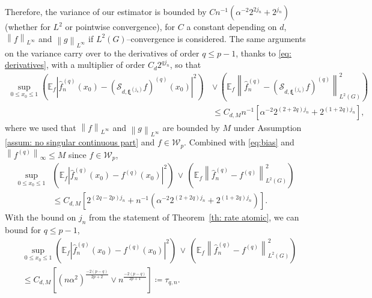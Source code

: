 \documentclass[preprint]{imsart}
\newcommand\norm[1]{\left\lVert#1\right\rVert}
\numberwithin{equation}{section}
\begin{document}
\begin{appendix}
Therefore, the variance of our estimator is bounded by $Cn^{-1}\left(\alpha^{-2}2^{2j_n}+2^{j_n}\right)$ (whether for $L^2$ or pointwise convergence), for $C$ a constant depending on $d$, $\norm{f}_{L^\infty}$ and $\norm{g}_{L^\infty}$ if $L^2(G)$--convergence is considered. The same arguments on the variance carry over to the derivatives of order $q\leq p-1$, thanks to \eqref{eq: derivatives}, with a multiplier of order $C_d 2^{qj_n}$, so that 
\begin{align*}
\underset{0\leq x_0\leq 1}{\sup}\left(\mathbb{E}_f|\hat{f}_n^{(q)}(x_0) - (\mathcal{S}_{d,\mathbf{\xi}^{(j_n)}}f)^{(q)}(x_0)|^2\right)\,&\vee\, \left( \mathbb{E}_f\norm{\hat{f}_n^{(q)} - (\mathcal{S}_{d,\mathbf{\xi}^{(j_n)}}f)^{(q)}}_{L^2(G)}^2\right)\\&\leq C_{d,M} n^{-1}\left[\alpha^{-2} 2^{(2+2q)j_n} + 2^{(1+2q)j_n}\right],\end{align*}
where we used that $\norm{f}_{L^\infty}$ and $\norm{g}_{L^\infty}$ are bounded by $M$ under Assumption \ref{assum: no singular continuous part} and $f\in\mathcal{W}_p$. Combined with \eqref{eq:bias} and  $\norm{f^{(q)}}_{\infty}\leq M$ since $f\in\mathcal{W}_p$,
\begin{align}\label{eq: derivative loss}
   \underset{0\leq x_0\leq 1}{\sup}&\left(\mathbb{E}_f|\hat{f}_n^{(q)}(x_0) - f^{(q)}(x_0)|^2\right)\,\vee\, \left( \mathbb{E}_f\norm{\hat{f}_n^{(q)} - f^{(q)}}_{L^2(G)}^2\right)\nonumber\\ &\leq C_{d,M}\left[ 2^{(2q-2p)j_n}+ n^{-1}(\alpha^{-2} 2^{(2+2q)j_n} + 2^{(1+2q)j_n})\right]. 
\end{align}
With the bound on $j_n$ from the statement of Theorem~\ref{th: rate atomic}, we can bound for $q\leq p-1$,
\begin{align*}
    &\underset{0\leq x_0\leq 1}{\sup}\left(\mathbb{E}_f|\hat{f}_n^{(q)}(x_0) - f^{(q)}(x_0)|^2\right)\,\vee\, \left(\mathbb{E}_f\norm{\hat{f}_n^{(q)} - f^{(q)}}_{L^2(G)}^2\right)\\
    &\leq C_{d,M} \left[(n\alpha^2)^{\frac{-2(p-q)}{2p+2}}\vee n^{\frac{-2(p-q)}{2p+1}} \right]\coloneqq \tau_{q,n}.
\end{align*}



\end{appendix}
\end{document}
